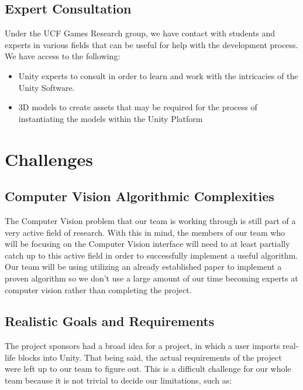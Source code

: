 \documentclass[12pt]{article}
\begin{document}
\subsection{Expert Consultation}\label{expert-consultation}

Under the UCF Games Research group, we have contact with students and
experts in various fields that can be useful for help with the
development process. We have access to the following:

\begin{itemize}
\item
  Unity experts to consult in order to learn and work with the
  intricacies of the Unity Software.
\item
  3D models to create assets that may be required for the process of
  instantiating the models within the Unity Platform
\end{itemize}

\section{Challenges}\label{challenges}

\subsection{Computer Vision Algorithmic
Complexities}\label{computer-vision-algorithmic-complexities}

The Computer Vision problem that our team is working through is still
part of a very active field of research. With this in mind, the members
of our team who will be focusing on the Computer Vision interface will
need to at least partially catch up to this active field in order to
successfully implement a useful algorithm. Our team will be using
utilizing an already established paper to implement a proven algorithm
so we don't use a large amount of our time becoming experts at computer
vision rather than completing the project.

\subsection{Realistic Goals and
Requirements}\label{realistic-goals-and-requirements}

The project sponsors had a broad idea for a project, in which a user
imports real-life blocks into Unity. That being said, the actual
requirements of the project were left up to our team to figure out. This
is a difficult challenge for our whole team because it is not trivial to
decide our limitations, such as:
\end{document}

